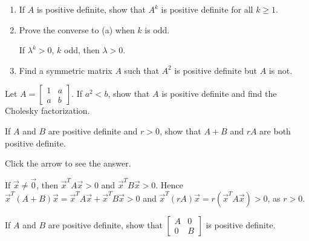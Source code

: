 \documentclass{ximera}
\begin{document}
\begin{problem}\label{prob:pos_def_2}
\begin{enumerate}[label={\alph*.}]
\item If $A$ is positive definite, show that $A^{k}$ is positive definite for all $k \geq 1$.

\item Prove the converse to (a) when $k$ is odd.

\begin{hint}
If $\lambda^{k} > 0$, $k$ odd, then $\lambda > 0$.
\end{hint}

\item Find a symmetric matrix $A$ such that $A^{2}$ is positive definite but $A$ is not.

\end{enumerate}

\end{problem}

\begin{problem}\label{prob:pos_def_3}
Let $A = \left[ \begin{array}{rr}
1 & a \\
a & b
\end{array}\right]$. If $a^{2} < b$, show that $A$ is positive definite and find the Cholesky factorization.
\end{problem}

\begin{problem}\label{prob:pos_def_4}
If $A$ and $B$ are positive definite and $r > 0$, show that $A + B$ and $rA$ are both positive definite.

Click the arrow to see the answer.
\begin{expandable}{}{}
If $\vec{x} \neq \vec{0}$, then $\vec{x}^{T}A\vec{x} > 0$ and $\vec{x}^{T}B\vec{x} > 0$. Hence $\vec{x}^{T}(A + B)\vec{x} = \vec{x}^{T}A\vec{x} + \vec{x}^{T}B\vec{x} > 0$ and $\vec{x}^{T}(rA)\vec{x} = r(\vec{x}^{T}A\vec{x}) > 0$, as $r > 0$.
\end{expandable}

\end{problem}

\begin{problem}\label{prob:pos_def_5}
If $A$ and $B$ are positive definite, show that $\left[ \begin{array}{rr}
A & 0 \\
0 & B
\end{array}\right]$ is positive definite.
\end{problem}
\end{document}
